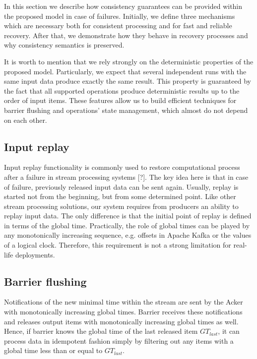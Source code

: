 
\label {fs-consistency-seciton}

In this section we describe how consistency guarantees can be provided within the proposed model in case of failures. Initially, we define three mechanisms which are necessary both for consistent processing and for fast and reliable recovery. After that, we demonstrate how they behave in recovery processes and why consistency semantics is preserved.

It is worth to mention that we rely strongly on the deterministic properties of the proposed model. Particularly, we expect that several independent runs with the same input data produce exactly the same result. This property is guaranteed by the fact that all supported operations produce deterministic results up to the order of input items. These features allow us to build efficient techniques for barrier flushing and operations' state management, which almost do not depend on each other.  

\subsection{Input replay}
Input replay functionality is commonly used to restore computational process after a failure in stream processing systems [?]. The key idea here is that in case of failure, previously released input data can be sent again. Usually, replay is started not from the beginning, but from some determined point. Like other stream processing solutions, our system requires from producers an ability to replay input data. The only difference is that the initial point of replay is defined in terms of the global time. Practically, the role of global times can be played by any monotonically increasing sequence, e.g. offsets in Apache Kafka or the values of a logical clock. Therefore, this requirement is not a strong limitation for real-life deployments.

\subsection{Barrier flushing}
Notifications of the new minimal time within the stream are sent by the Acker with monotonically increasing global times. Barrier receives these notifications and releases output items with monotonically increasing global times as well. Hence, if barrier knows the global time of the last released item $GT_{last}$, it can process data in idempotent fashion simply by filtering out any items with a global time less than or equal to $GT_{last}$. 

